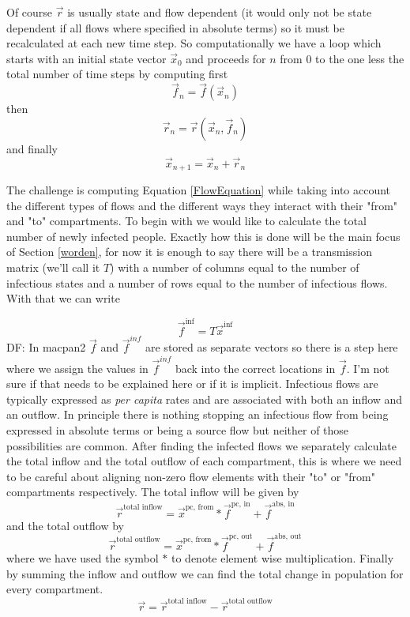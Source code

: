 \documentclass[pdflatex,sn-basic]{sn-jnl}%
\theoremstyle{definition}
\newcommand{\df}[1]{{\color{orange} DF: #1}}
\newcommand{\xvec}{\vec{x}}
\newcommand{\fvec}{\vec{f}}
\newcommand{\rvec}{\vec{r}}
\begin{document}
Of course $\rvec$ is usually state and flow dependent (it would only not be state dependent if all flows where specified in absolute terms) so it must be recalculated at each new time step. So computationally we have a loop which starts with an initial state vector $\xvec_0$ and proceeds for $n$ from 0 to the one less the total number of time steps by computing first
\[
    \fvec_n = \fvec(\xvec_n)
\]
then
\begin{equation}\label{FlowEquation}
    \rvec_n = \rvec(\xvec_n, \fvec_n)
\end{equation}
and finally
\[
    \xvec_{n+1} = \xvec_n + \rvec_n
\]

The challenge is computing Equation \ref{FlowEquation} while taking into account the different types of flows and the different ways they interact with their "from" and "to" compartments. To begin with we would like to calculate the total number of newly infected people. Exactly how this is done will be the main focus of Section \ref{worden}, for now it is enough to say there will be a transmission matrix (we'll call it $T$) with a number of columns equal to the number of infectious states and a number of rows equal to the number of infectious flows. With that we can write
    
\begin{equation}\label{infectionequation}
\fvec^\text{inf} = T\xvec^\text{inf}
\end{equation}
\df{In macpan2 $\fvec$ and $\fvec^{inf}$ are stored as separate vectors so there is a step here where we assign the values in $\fvec^{inf}$ back into the correct locations in $\fvec$. I'm not sure if that needs to be explained here or if it is implicit.}
Infectious flows are typically expressed as \emph{per capita} rates and are associated with both an inflow and an outflow. In principle there is nothing stopping an infectious flow from being expressed in absolute terms or being a source flow but neither of those possibilities are common. After finding the infected flows we separately calculate the total inflow and the total outflow of each compartment, this is where we need to be careful about aligning non-zero flow elements with their "to" or "from" compartments respectively. The total inflow will be given by
\[
    \rvec^\text{total inflow} = \xvec^\text{pc, from} * \fvec^\text{pc, in} + \fvec^\text{abs, in}
\]
and the total outflow by     
\[
    \rvec^\text{total outflow} = \xvec^\text{pc, from} * \fvec^\text{pc, out} + \fvec^\text{abs, out}
\]
where we have used the symbol $*$ to denote element wise multiplication. Finally by summing the inflow and outflow we can find the total change in population for every compartment.
\[
\rvec = \rvec^\text{total inflow} - \rvec^\text{total outflow}
\]     
\end{document}
